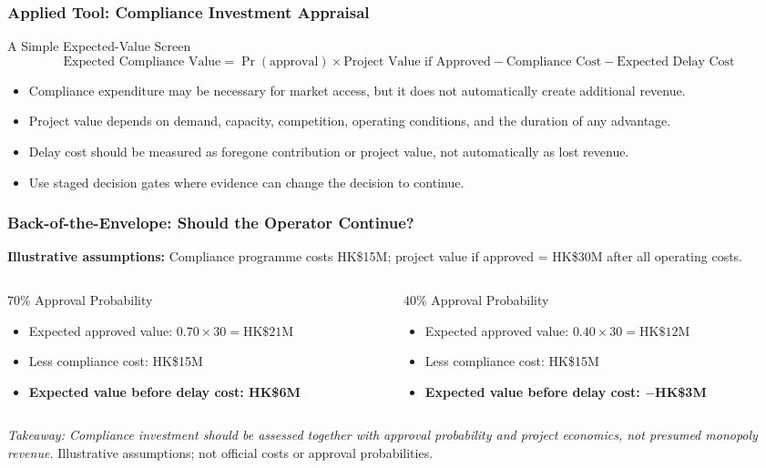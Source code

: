 \documentclass{beamer}
\begin{document}
\begin{frame}[t]
\frametitle{Applied Tool: Compliance Investment Appraisal}
\begin{block}{A Simple Expected-Value Screen}
\[
\text{Expected Compliance Value}
=
\Pr(\text{approval})\times\text{Project Value if Approved}
-\text{Compliance Cost}
-\text{Expected Delay Cost}
\]
\end{block}
\begin{itemize}
\item Compliance expenditure may be necessary for market access, but it does not automatically create additional revenue.
\item Project value depends on demand, capacity, competition, operating conditions, and the duration of any advantage.
\item Delay cost should be measured as foregone contribution or project value, not automatically as lost revenue.
\item Use staged decision gates where evidence can change the decision to continue.
\end{itemize}
\end{frame}

\begin{frame}[t,shrink=11]
\frametitle{Back-of-the-Envelope: Should the Operator Continue?}
\textbf{Illustrative assumptions:} Compliance programme costs HK\$15M; project value if approved = HK\$30M after all operating costs.
\begin{columns}[T]
\begin{column}{0.48\textwidth}\begin{block}{70\% Approval Probability}
\begin{itemize}
\item Expected approved value: $0.70\times30=\text{HK\$21M}$
\item Less compliance cost: HK\$15M
\item \textbf{Expected value before delay cost: HK\$6M}
\end{itemize}\end{block}\end{column}
\begin{column}{0.48\textwidth}\begin{block}{40\% Approval Probability}
\begin{itemize}
\item Expected approved value: $0.40\times30=\text{HK\$12M}$
\item Less compliance cost: HK\$15M
\item \textbf{Expected value before delay cost: $-$HK\$3M}
\end{itemize}\end{block}\end{column}
\end{columns}
\textit{Takeaway: Compliance investment should be assessed together with approval probability and project economics, not presumed monopoly revenue.}
\vfill{\tiny Illustrative assumptions; not official costs or approval probabilities.}
\end{frame}
\end{document}
